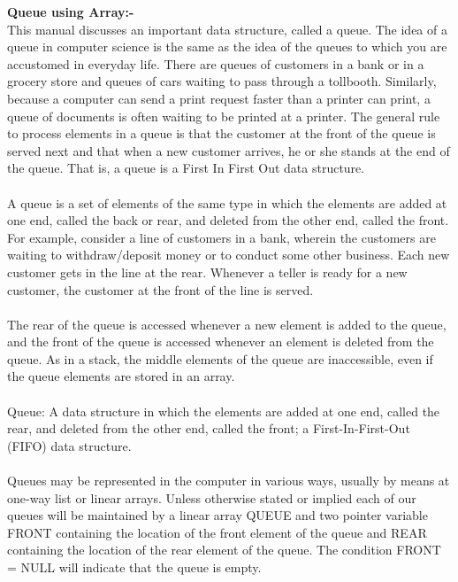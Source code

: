 \documentclass[11pt]{article}            %
\begin{document}
\textbf{Queue using Array:-}\\
This manual discusses an important data structure, called a queue. The idea of a queue in
computer science is the same as the idea of the queues to which you are accustomed in
everyday life. There are queues of customers in a bank or in a grocery store and queues of cars
waiting to pass through a tollbooth. Similarly, because a computer can send a print request faster
than a printer can print, a queue of documents is often waiting to be printed at a printer. The
general rule to process elements in a queue is that the customer at the front of the queue is served
next and that when a new customer arrives, he or she stands at the end of the queue. That is, a
queue is a First In First Out data structure.\\~\\
A queue is a set of elements of the same type in which the elements are added at one end, called
the back or rear, and deleted from the other end, called the front. For example, consider a line
of customers in a bank, wherein the customers are waiting to withdraw/deposit money or to
conduct some other business. Each new customer gets in the line at the rear. Whenever a teller
is ready for a new customer, the customer at the front of the line is served.\\~\\
The rear of the queue is accessed whenever a new element is added to the queue, and the front
of the queue is accessed whenever an element is deleted from the queue. As in a stack, the
middle elements of the queue are inaccessible, even if the queue elements are stored in an array.\\~\\
Queue: A data structure in which the elements are added at one end, called the rear, and deleted
from the other end, called the front; a First-In-First-Out (FIFO) data structure.\\~\\
Queues may be represented in the computer in various ways, usually by means at one-way list
or linear arrays. Unless otherwise stated or implied each of our queues will be maintained
by a linear array QUEUE and two pointer variable FRONT containing the location of the
front element of the queue and REAR containing the location of the rear element of the queue.
The condition FRONT = NULL will indicate that the queue is empty.\\~\\
\end{document}
